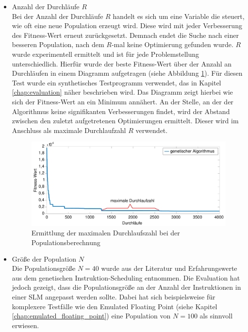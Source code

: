 \begin{itemize}
	\item Anzahl der Durchläufe $R$\\
		Bei der Anzahl der Durchläufe $R$ handelt es sich um eine Variable die steuert, wie oft eine neue Population erzeugt wird. Diese wird mit jeder Verbesserung des Fitness-Wert erneut zurückgesetzt. Demnach endet die Suche nach einer besseren Population, nach dem $R$-mal keine Optimierung gefunden wurde.
		$R$ wurde experimentell ermittelt und ist für jede Problemstellung unterschiedlich. Hierfür wurde der beste Fitness-Wert über der Anzahl an Durchläufen in einem Diagramm aufgetragen (siehe Abbildung \ref{fig:iteration_analyse}). Für diesen Test wurde ein synthetisches Testprogramm verwendet, das in Kapitel \ref{chap:evaluation} näher beschrieben wird. Das Diagramm zeigt hierbei wie sich der Fitness-Wert an ein Minimum annähert. An der Stelle, an der der Algorithmus keine signifikanten Verbesserungen findet, wird der Abstand zwischen den zuletzt aufgetretenen Optimierungen ermittelt. Dieser wird im Anschluss als maximale Durchlaufzahl $R$ verwendet.
		
		\begin{figure}[H]
			\centering
			\includegraphics[width=\textwidth]{fig/iteration_analyse.pdf}
			\caption{Ermittlung der maximalen Durchlaufszahl bei der Populationsberechnung}
			\label{fig:iteration_analyse}
		\end{figure}
	
	\item Größe der Population $N$\\
		Die Populationsgröße $N = 40$ wurde aus der Literatur \cite{grefenstette1986optimization} und Erfahrungswerte aus dem genetischen Instruktion-Scheduling entnommen. Die Evaluation hat jedoch gezeigt, dass die Populationsgröße an der Anzahl der Instruktionen in einer SLM angepasst werden sollte. Dabei hat sich beispielsweise für komplexere Testfälle wie den Emulated Floating Point (siehe Kapitel \ref{chap:emulated_floating_point}) eine Population von $N = 100$ als sinnvoll erwiesen.
	

\end{itemize}

